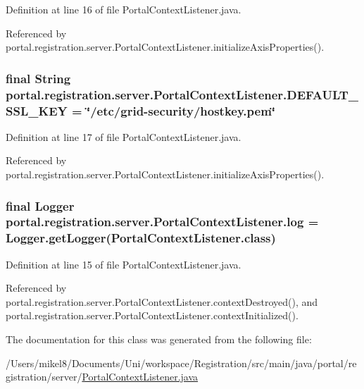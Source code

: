 Definition at line 16 of file PortalContextListener.java.



Referenced by portal.registration.server.PortalContextListener.initializeAxisProperties().

\hypertarget{classportal_1_1registration_1_1server_1_1PortalContextListener_a88510b32b342fcacfe0f48d5fb1b17e9}{
\subsubsection[{DEFAULT\_\-SSL\_\-KEY}]{\setlength{\rightskip}{0pt plus 5cm}final String {\bf portal.registration.server.PortalContextListener.DEFAULT\_\-SSL\_\-KEY} = \char`\"{}/etc/grid-\/security/hostkey.pem\char`\"{}}}
\label{classportal_1_1registration_1_1server_1_1PortalContextListener_a88510b32b342fcacfe0f48d5fb1b17e9}


Definition at line 17 of file PortalContextListener.java.



Referenced by portal.registration.server.PortalContextListener.initializeAxisProperties().

\hypertarget{classportal_1_1registration_1_1server_1_1PortalContextListener_a456018b93684d7862baf2345b0e02da5}{
\subsubsection[{log}]{\setlength{\rightskip}{0pt plus 5cm}final Logger {\bf portal.registration.server.PortalContextListener.log} = Logger.getLogger(PortalContextListener.class)}}
\label{classportal_1_1registration_1_1server_1_1PortalContextListener_a456018b93684d7862baf2345b0e02da5}


Definition at line 15 of file PortalContextListener.java.



Referenced by portal.registration.server.PortalContextListener.contextDestroyed(), and portal.registration.server.PortalContextListener.contextInitialized().



The documentation for this class was generated from the following file:\begin{DoxyCompactItemize}
\item 
/Users/mikel8/Documents/Uni/workspace/Registration/src/main/java/portal/registration/server/\hyperlink{PortalContextListener_8java}{PortalContextListener.java}\end{DoxyCompactItemize}
